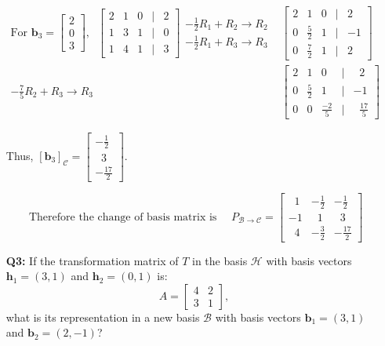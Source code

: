 \documentclass[a4paper,11pt,reqno]{amsart}
\numberwithin{equation}{section}
\begin{document}
\begin{enumerate}
\begin{center}
{{\begin{eqnarray*}
    \text{For } \mathbf{b}_3 = \begin{bmatrix} 2 \\ 0 \\ 3 \end{bmatrix}, \;\;
    \begin{bmatrix} 
    2 & 1 & 0 & | & 2 \\ 
    1 & 3 & 1 & | & 0 \\ 
    1 & 4 & 1 & | & 3 
    \end{bmatrix}
    \begin{array}{c}
      -\frac{1}{2} R_1 + R_2 \to R_2\\  
      - \frac{1}{2} R_1 + R_3 \to R_3 
    \end{array}& 
    \begin{bmatrix} 
    2 & 1 & 0 & | & 2 \\ 
    0 & \frac{5}{2} & 1 & | & -1 \\ 
    0 & \frac{7}{2} & 1 & | & 2 
    \end{bmatrix}\\
    - \frac{7}{5} R_2 + R_3 \to R_3&
    \begin{bmatrix} 
    2 & 1 & 0 & | & \;\;2 \\ 
    0 & \frac{5}{2} & 1 & | & -1 \\ 
    0 & 0 & \frac{-2}{5} & | & \;\;\frac{17}{5} 
    \end{bmatrix}
    \end{eqnarray*}

    Thus, \( [\mathbf{b}_3]_{\mathcal{C}} = \begin{bmatrix} -\frac{1}{2} \\ \;\;3 \\ -\frac{17}{2} \end{bmatrix} \).

    
    \[
    \text{ Therefore the change of basis matrix is }\quad
    P_{\mathcal{B} \to \mathcal{C}} = 
    \begin{bmatrix}
    \;\;1 & -\frac{1}{2} & -\frac{1}{2} \\
    -1 & \;\;1 & \;\;3 \\
    \;\;4 & -\frac{3}{2} & -\frac{17}{2}
    \end{bmatrix}
    \]
    }}

    \end{center}

    \item[\textbf{Q3:}]
    If the transformation matrix of \( T \) in the basis \( {\mathcal{H}} \) with basis vectors \( \mathbf{h}_1 = (3,1) \) and \( \mathbf{h}_2 = (0,1) \) is:
    \[
    A = \begin{bmatrix} 4 & 2 \\ 3 & 1 \end{bmatrix},
    \]
    what is its representation in a new basis \( {\mathcal{B}} \) with basis vectors \( \mathbf{b}_1 = (3,1) \) and \( \mathbf{b}_2 = (2,-1) \)?


\end{enumerate}
\end{document}

